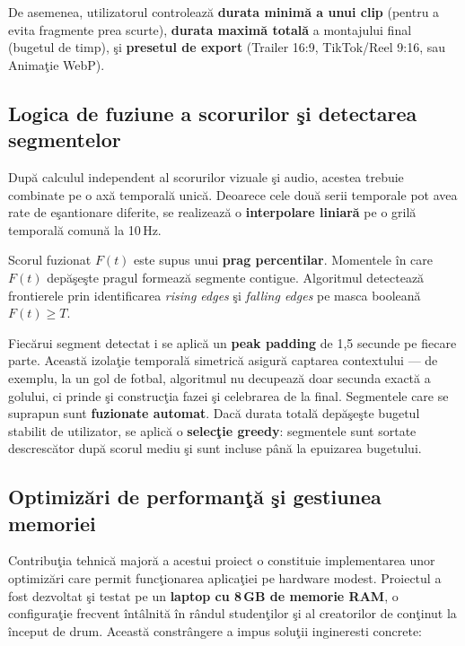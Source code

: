 \documentclass[12pt,a4paper]{article}
\begin{document}
De asemenea, utilizatorul controleaz\u{a}{} \textbf{durata minim\u{a}{} a unui clip} (pentru a evita fragmente prea scurte), \textbf{durata maxim\u{a}{} total\u{a}} a montajului final (bugetul de timp), \c{s}i \textbf{presetul de export} (Trailer 16:9, TikTok/Reel 9:16, sau Anima\c{t}ie WebP).

\subsection{Logica de fuziune a scorurilor \c{s}i detectarea segmentelor}

Dup\u{a}{} calculul independent al scorurilor vizuale \c{s}i audio, acestea trebuie combinate pe o ax\u{a}{} temporal\u{a}{} unic\u{a}. Deoarece cele dou\u{a}{} serii temporale pot avea rate de e\c{s}antionare diferite, se realizeaz\u{a}{} o \textbf{interpolare liniar\u{a}} pe o gril\u{a}{} temporal\u{a}{} comun\u{a}{} la 10\,Hz.

Scorul fuzionat $F(t)$ este supus unui \textbf{prag percentilar}. Momentele \^{i}n care $F(t)$ dep\u{a}\c{s}e\c{s}te pragul formeaz\u{a}{} segmente contigue. Algoritmul detecteaz\u{a}{} frontierele prin identificarea \textit{rising edges} \c{s}i \textit{falling edges} pe masca boolean\u{a}{} $F(t) \geq T$.

Fiec\u{a}rui segment detectat i se aplic\u{a}{} un \textbf{peak padding} de 1,5 secunde pe fiecare parte. Aceast\u{a}{} izola\c{t}ie temporal\u{a}{} simetric\u{a}{} asigur\u{a}{} captarea contextului --- de exemplu, la un gol de fotbal, algoritmul nu decupeaz\u{a}{} doar secunda exact\u{a}{} a golului, ci prinde \c{s}i construc\c{t}ia fazei \c{s}i celebrarea de la final. Segmentele care se suprapun sunt \textbf{fuzionate automat}. Dac\u{a}{} durata total\u{a}{} dep\u{a}\c{s}e\c{s}te bugetul stabilit de utilizator, se aplic\u{a}{} o \textbf{selec\c{t}ie greedy}: segmentele sunt sortate descresc\u{a}tor dup\u{a}{} scorul mediu \c{s}i sunt incluse p\^{a}n\u{a}{} la epuizarea bugetului.

\subsection{Optimiz\u{a}ri de performan\c{t}\u{a}{} \c{s}i gestiunea memoriei}

Contribu\c{t}ia tehnic\u{a}{} major\u{a}{} a acestui proiect o constituie implementarea unor optimiz\u{a}ri care permit func\c{t}ionarea aplica\c{t}iei pe hardware modest. Proiectul a fost dezvoltat \c{s}i testat pe un \textbf{laptop cu 8\,GB de memorie RAM}, o configura\c{t}ie frecvent \^{i}nt\^{a}lnit\u{a}{} \^{i}n r\^{a}ndul studen\c{t}ilor \c{s}i al creatorilor de con\c{t}inut la \^{i}nceput de drum. Aceast\u{a}{} constr\^{a}ngere a impus solu\c{t}ii ingineresti concrete:
\end{document}
